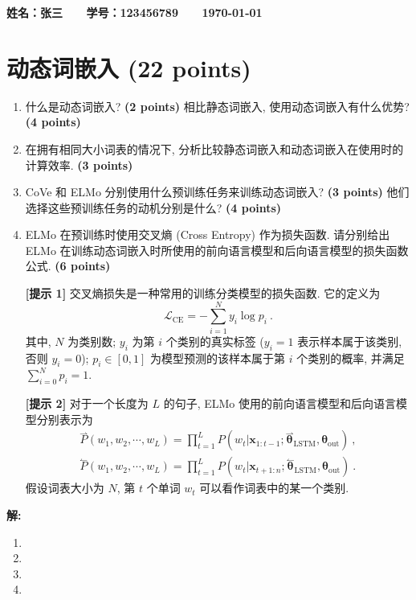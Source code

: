 \documentclass[8pt]{article}
\newcommand{\points}[1]{\textbf{(#1 points)}}
\begin{document}
\textbf{\color{blue} \Large 姓名：张三 \ \ \ 学号：123456789 \ \ \ \today}

\section{动态词嵌入 \points{22}}

{\color{gray}\begin{enumerate}
    \item 什么是动态词嵌入? \points{2} 相比静态词嵌入, 使用动态词嵌入有什么优势? \points{4}
    \item 在拥有相同大小词表的情况下, 分析比较静态词嵌入和动态词嵌入在使用时的计算效率. \points{3}
    \item CoVe 和 ELMo 分别使用什么预训练任务来训练动态词嵌入? \points{3} 他们选择这些预训练任务的动机分别是什么? \points{4}
    \item ELMo 在预训练时使用交叉熵 (Cross Entropy) 作为损失函数. 请分别给出 ELMo 在训练动态词嵌入时所使用的前向语言模型和后向语言模型的损失函数公式. \points{6}
    
    \textbf{[提示 1]} 交叉熵损失是一种常用的训练分类模型的损失函数. 它的定义为
    \begin{equation}
        \mathcal{L}_\text{CE} = -\sum_{i=1}^N y_i\log p_i \ .
    \end{equation}
    其中, $N$ 为类别数; $y_i$ 为第 $i$ 个类别的真实标签 ($y_i=1$ 表示样本属于该类别, 否则 $y_i=0$); $p_i\in[0,1]$ 为模型预测的该样本属于第 $i$ 个类别的概率, 并满足 $\sum_{i=0}^N p_i=1$. 

    \textbf{[提示 2]} 对于一个长度为 $L$ 的句子, ELMo 使用的前向语言模型和后向语言模型分别表示为
    \begin{align}
        \overset{\rightharpoonup}{P}(w_1, w_2, \cdots, w_L) = \prod_{t=1}^L P(w_t|\mathbf{x}_{1:t-1};\overset{\rightharpoonup}{\boldsymbol{\theta}}_\text{LSTM}, \boldsymbol{\theta}_\text{out}) \ , \\
        \overset{\leftharpoonup}{P}(w_1, w_2, \cdots, w_L) = \prod_{t=1}^L P(w_t|\mathbf{x}_{t+1:n};\overset{\leftharpoonup}{\boldsymbol{\theta}}_\text{LSTM}, \boldsymbol{\theta}_\text{out}) \ .
    \end{align}
    假设词表大小为 $N$, 第 $t$ 个单词 $w_t$ 可以看作词表中的某一个类别.
\end{enumerate}}

\textbf{\large 解:}
\begin{enumerate}
    \item %
    \item %
    \item %
    \item %
\end{enumerate}
\end{document}
